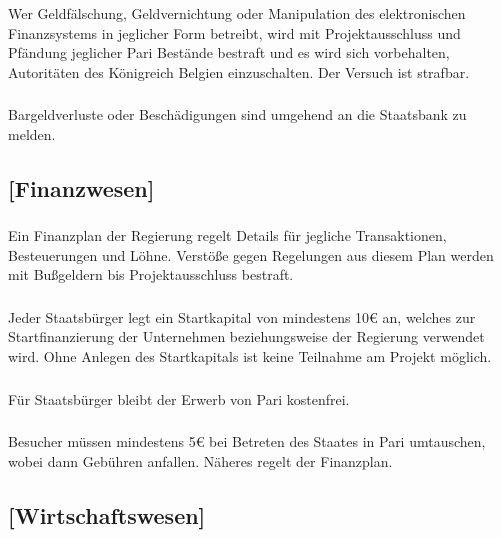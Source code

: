 \documentclass[a4paper, 11pt]{report}
\let\oldsubsection\subsection
\renewcommand{\subsection}{\leftskip=40pt\oldsubsection}
\begin{document}
\subsubsection{}
Wer Geldfälschung, Geldvernichtung oder Manipulation des elektronischen Finanzsystems in jeglicher Form betreibt, wird mit Projektausschluss und Pfändung jeglicher Pari Bestände bestraft und es wird sich vorbehalten, Autoritäten des Königreich Belgien einzuschalten. Der Versuch ist strafbar. 

\subsubsection{}
Bargeldverluste oder Beschädigungen sind umgehend an die Staatsbank zu melden.


\subsection{[Finanzwesen]}


\subsubsection{}
Ein Finanzplan der Regierung regelt Details für jegliche Transaktionen, Besteuerungen und Löhne. Verstöße gegen Regelungen aus diesem Plan werden mit Bußgeldern bis Projektausschluss bestraft. 

\subsubsection{}
Jeder Staatsbürger legt ein Startkapital von mindestens 10€ an, welches zur Startfinanzierung der Unternehmen beziehungsweise der Regierung verwendet wird. Ohne Anlegen des Startkapitals ist keine Teilnahme am Projekt möglich.

\subsubsection{}
Für Staatsbürger bleibt der Erwerb von Pari kostenfrei.

\subsubsection{}
Besucher müssen mindestens 5€ bei Betreten des Staates in Pari umtauschen, wobei dann Gebühren anfallen. Näheres regelt der Finanzplan.
 

\subsection{[Wirtschaftswesen]}
\end{document}
